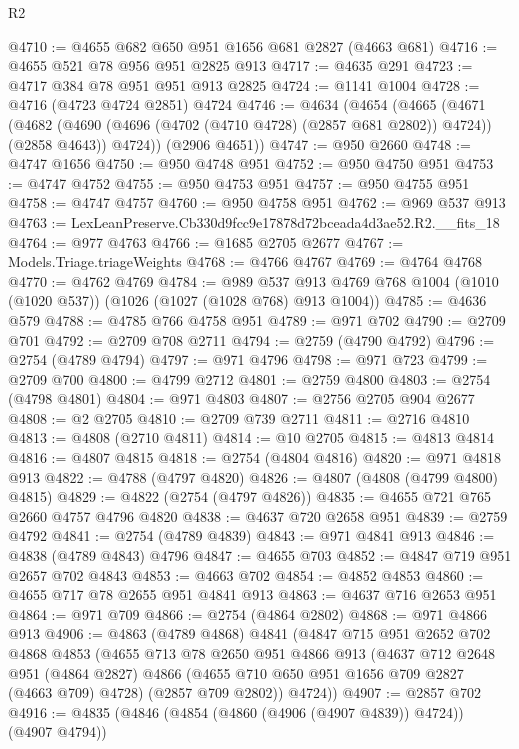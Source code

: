 \begin{lexlean}{R2}
\begin{coremodule}
@4710 := @4655 @682 @650 @951 @1656 @681 @2827 (@4663 @681)
@4716 := @4655 @521 @78 @956 @951 @2825 @913
@4717 := @4635 @291
@4723 := @4717 @384 @78 @951 @951 @913 @2825
@4724 := @1141 @1004
@4728 := @4716 (@4723 @4724 @2851) @4724
@4746 := @4634
    (@4654
      (@4665
        (@4671
          (@4682 (@4690 (@4696 (@4702 (@4710 @4728) (@2857 @681 @2802)) @4724)) (@2858 @4643))
          @4724))
      (@2906 @4651))
@4747 := @950 @2660
@4748 := @4747 @1656
@4750 := @950 @4748 @951
@4752 := @950 @4750 @951
@4753 := @4747 @4752
@4755 := @950 @4753 @951
@4757 := @950 @4755 @951
@4758 := @4747 @4757
@4760 := @950 @4758 @951
@4762 := @969 @537 @913
@4763 := LexLeanPreserve.Cb330d9fcc9e17878d72bceada4d3ae52.R2.__fits_18
@4764 := @977 @4763
@4766 := @1685 @2705 @2677
@4767 := Models.Triage.triageWeights
@4768 := @4766 @4767
@4769 := @4764 @4768
@4770 := @4762 @4769
@4784 := @989
    @537
    @913
    @4769
    @768
    @1004
    (@1010 (@1020 @537))
    (@1026 (@1027 (@1028 @768) @913 @1004))
@4785 := @4636 @579
@4788 := @4785 @766 @4758 @951
@4789 := @971 @702
@4790 := @2709 @701
@4792 := @2709 @708 @2711
@4794 := @2759 (@4790 @4792)
@4796 := @2754 (@4789 @4794)
@4797 := @971 @4796
@4798 := @971 @723
@4799 := @2709 @700
@4800 := @4799 @2712
@4801 := @2759 @4800
@4803 := @2754 (@4798 @4801)
@4804 := @971 @4803
@4807 := @2756 @2705 @904 @2677
@4808 := @2 @2705
@4810 := @2709 @739 @2711
@4811 := @2716 @4810
@4813 := @4808 (@2710 @4811)
@4814 := @10 @2705
@4815 := @4813 @4814
@4816 := @4807 @4815
@4818 := @2754 (@4804 @4816)
@4820 := @971 @4818 @913
@4822 := @4788 (@4797 @4820)
@4826 := @4807 (@4808 (@4799 @4800) @4815)
@4829 := @4822 (@2754 (@4797 @4826))
@4835 := @4655 @721 @765 @2660 @4757 @4796 @4820
@4838 := @4637 @720 @2658 @951
@4839 := @2759 @4792
@4841 := @2754 (@4789 @4839)
@4843 := @971 @4841 @913
@4846 := @4838 (@4789 @4843) @4796
@4847 := @4655 @703
@4852 := @4847 @719 @951 @2657 @702 @4843
@4853 := @4663 @702
@4854 := @4852 @4853
@4860 := @4655 @717 @78 @2655 @951 @4841 @913
@4863 := @4637 @716 @2653 @951
@4864 := @971 @709
@4866 := @2754 (@4864 @2802)
@4868 := @971 @4866 @913
@4906 := @4863
    (@4789 @4868)
    @4841
    (@4847
      @715
      @951
      @2652
      @702
      @4868
      @4853
      (@4655
        @713
        @78
        @2650
        @951
        @4866
        @913
        (@4637
          @712
          @2648
          @951
          (@4864 @2827)
          @4866
          (@4655 @710 @650 @951 @1656 @709 @2827 (@4663 @709) @4728)
          (@2857 @709 @2802))
        @4724))
@4907 := @2857 @702
@4916 := @4835 (@4846 (@4854 (@4860 (@4906 (@4907 @4839)) @4724)) (@4907 @4794))

\end{coremodule}
\end{lexlean}
